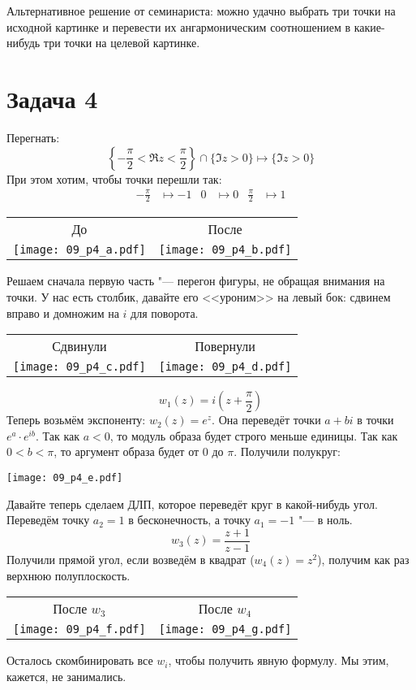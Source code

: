 	Альтернативное решение от семинариста: можно удачно выбрать три точки на исходной картинке и перевести их
	ангармоническим соотношением в какие-нибудь три точки на целевой картинке.

\section{Задача 4}
	Перегнать:
	\[
		\left\{ -\frac \pi 2 < \Re z < \frac \pi 2 \right\}
		\cap
		\{ \Im z > 0 \}
		\mapsto
		\{ \Im z > 0 \}
	\]
	При этом хотим, чтобы точки перешли так:
	\begin{align*}
		-\frac \pi 2 &\mapsto -1 &
		0 &\mapsto 0 &
		\frac \pi 2 &\mapsto 1
	\end{align*}
	\begin{center}
		\begin{tabular}{cc}
		До & После \\
		\texttt{[image: 09\_p4\_a.pdf]} & \texttt{[image: 09\_p4\_b.pdf]} \\
		\end{tabular}
	\end{center}

	Решаем сначала первую часть "--- перегон фигуры, не обращая внимания на точки.
	У нас есть столбик, давайте его <<уроним>> на левый бок: сдвинем вправо и домножим на $i$ для поворота.
	\begin{center}
		\begin{tabular}{cc}
		Сдвинули & Повернули \\
		\texttt{[image: 09\_p4\_c.pdf]} & \texttt{[image: 09\_p4\_d.pdf]} \\
		\end{tabular}
	\end{center}
	\[
		w_1(z) = i\left(z + \frac \pi 2\right)
	\]
	Теперь возьмём экспоненту: $w_2(z)=e^z$.
	Она переведёт точки $a+bi$ в точки $e^a \cdot e^{ib}$.
	Так как $a < 0$, то модуль образа будет строго меньше единицы.
	Так как $0 < b < \pi$, то аргумент образа будет от 0 до $\pi$.
	Получили полукруг:
	\begin{center}
		\texttt{[image: 09\_p4\_e.pdf]}
	\end{center}

	Давайте теперь сделаем ДЛП, которое переведёт круг в какой-нибудь угол.
	Переведём точку $a_2=1$ в бесконечность, а точку $a_1=-1$ "--- в ноль.
	\[
		w_3(z) = \frac{z+1}{z-1}
	\]
	Получили прямой угол, если возведём в квадрат ($w_4(z)=z^2$), получим как раз верхнюю полуплоскость.
	\begin{center}
		\begin{tabular}{cc}
		После $w_3$ & После $w_4$ \\
		\texttt{[image: 09\_p4\_f.pdf]} & \texttt{[image: 09\_p4\_g.pdf]} \\
		\end{tabular}
	\end{center}
	Осталось скомбинировать все $w_i$, чтобы получить явную формулу.
	Мы этим, кажется, не занимались.

